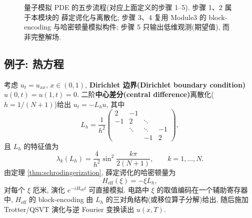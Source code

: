 \documentclass[utf8]{article} %
\numberwithin{equation}{section}   %
\newtheorem{Eg}{\hskip 2em {\color{black} 例}}[subsection]
\begin{document}
\begin{figure}[H]
\centering
{}
\caption{量子模拟 PDE 的五步流程(对应上面定义的步骤 1--5). 步骤 1、2 属于本模块的
薛定谔化与离散化; 步骤 3、4 复用 Module3 的 block-encoding 与哈密顿量模拟构件;
步骤 5 只输出低维观测(期望值), 而非完整解场.}
\label{fig:schrod-pipeline}
\end{figure}

\subsection{例子: 热方程}

\begin{Eg}[一维热方程]
    考虑 $u_t = u_{xx}$, $x \in (0,1)$, \textbf{Dirichlet 边界(Dirichlet boundary condition)} $u(0,t) = u(1,t) = 0$.
    二阶\textbf{中心差分(central difference)}离散化($h = 1/(N+1)$)给出 $u_t = -L_h u$, 其中
    \begin{equation}
        L_h = \frac{1}{h^2}
        \begin{pmatrix}
            2 & -1 & & \\ -1 & 2 & \ddots & \\ & \ddots & \ddots & -1 \\ & & -1 & 2
        \end{pmatrix},
    \end{equation}
    且 $L_h$ 的特征值为
    \begin{equation}
        \lambda_k(L_h) = \frac{4}{h^2}\sin^2\frac{k\pi}{2(N+1)}, \qquad k = 1, \dots, N.
    \end{equation}
    由定理 \ref{thm:schrodingerization}, 薛定谔化的哈密顿量为
    \begin{equation}
        H_{\mathrm{eff}}(\xi) = -\xi L_h,
    \end{equation}
    对每个 $\xi$ 厄米, 演化 $e^{-iH_{\mathrm{eff}}t}$ 可直接模拟.
    电路中 $\xi$ 的取值编码在一个辅助寄存器中, $H_{\mathrm{eff}}$ 的
    block-encoding 由 $L_h$ 的三对角结构(或移位算子分解)给出,
    随后施加 Trotter/QSVT 演化与逆 Fourier 变换读出 $u(x,T)$.
\end{Eg}
\end{document}
